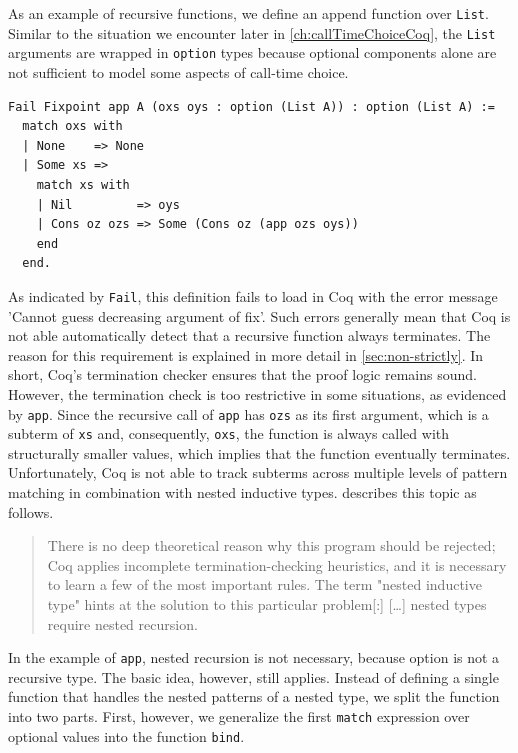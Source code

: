 \documentclass[a4paper, 11pt, fleqn, twoside]{scrreprt}
\newcommand{\cinl}[1]{\texttt{#1}}
\begin{document}
As an example of recursive functions, we define an append function over \cinl{List}.
Similar to the situation we encounter later in \autoref{ch:callTimeChoiceCoq}, the \cinl{List} arguments are wrapped in \cinl{option} types because optional components alone are not sufficient to model some aspects of call-time choice.

\begin{verbatim}
Fail Fixpoint app A (oxs oys : option (List A)) : option (List A) :=
  match oxs with
  | None    => None
  | Some xs =>
    match xs with
    | Nil         => oys
    | Cons oz ozs => Some (Cons oz (app ozs oys))
    end
  end.
\end{verbatim}

As indicated by \cinl{Fail}, this definition fails to load in Coq with the error message 'Cannot guess decreasing argument of fix'.
Such errors generally mean that Coq is not able automatically detect that a recursive function always terminates.
The reason for this requirement is explained in more detail in \autoref{sec:non-strictly}.
In short, Coq's termination checker ensures that the proof logic remains sound.
However, the termination check is too restrictive in some situations, as evidenced by \cinl{app}.
Since the recursive call of \cinl{app} has \cinl{ozs} as its first argument, which is a subterm of \cinl{xs} and, consequently, \cinl{oxs}, the function is always called with structurally smaller values, which implies that the function eventually terminates.
Unfortunately, Coq is not able to track subterms across multiple levels of pattern matching in combination with nested inductive types. \citet{chlipala2013certified} describes this topic as follows.

\begin{quotation}
\noindent
There is no deep theoretical reason why this program should be rejected; Coq applies incomplete termination-checking heuristics, and it is necessary to learn a few of the most important rules. The term "nested inductive type" hints at the solution to this particular problem[:] [\dots{}] nested types require nested recursion.
\end{quotation}

In the example of \cinl{app}, nested recursion is not necessary, because option is not a recursive type.
The basic idea, however, still applies.
Instead of defining a single function that handles the nested patterns of a nested type, we split the function into two parts.
First, however, we generalize the first \cinl{match} expression over optional values into the function \cinl{bind}.
\end{document}
